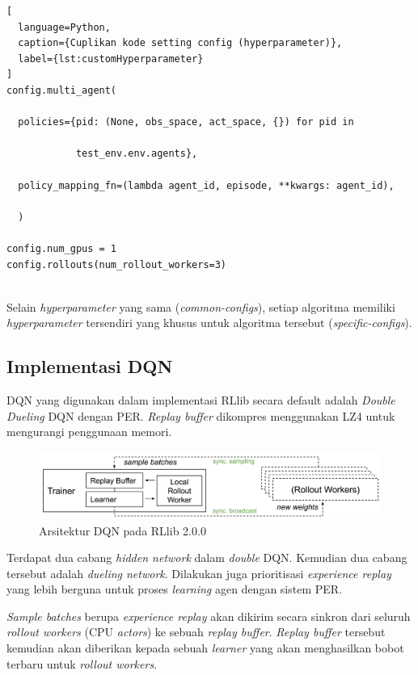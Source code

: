 \begin{lstlisting}[
  language=Python,
  caption={Cuplikan kode setting config (hyperparameter)},
  label={lst:customHyperparameter}
]
config.multi_agent(

  policies={pid: (None, obs_space, act_space, {}) for pid in

            test_env.env.agents},

  policy_mapping_fn=(lambda agent_id, episode, **kwargs: agent_id),

  )  

config.num_gpus = 1
config.rollouts(num_rollout_workers=3)
    
\end{lstlisting}

Selain \emph{hyperparameter} yang sama (\emph{common-configs}), setiap algoritma memiliki \emph{hyperparameter}
tersendiri yang khusus untuk algoritma tersebut (\emph{specific-configs}).

\subsection{Implementasi DQN}
DQN yang digunakan dalam implementasi RLlib secara default adalah \emph{Double Dueling} DQN
dengan PER. \emph{Replay buffer} dikompres menggunakan LZ4 untuk mengurangi penggunaan memori.

\begin{figure}[H]
  \centering
    \includegraphics[scale=0.6]{gambar/rllib_dqn_architecture.png}
    \caption{Arsitektur DQN pada RLlib 2.0.0 \citep{rllibDocumentation}}
    \label{fig:rllibDqnArchitecture}
\end{figure}

Terdapat dua cabang \emph{hidden network} dalam \emph{double} DQN.
Kemudian dua cabang tersebut adalah \emph{dueling network}.
Dilakukan juga prioritisasi \emph{experience replay} yang lebih berguna untuk proses \emph{learning}
agen dengan sistem PER.

\emph{Sample batches} berupa \emph{experience replay} akan dikirim secara sinkron dari seluruh \emph{rollout workers} (CPU \emph{actors}) ke sebuah \emph{replay buffer}.
\emph{Replay buffer} tersebut kemudian akan diberikan kepada sebuah \emph{learner} yang akan menghasilkan bobot terbaru untuk \emph{rollout workers}.

